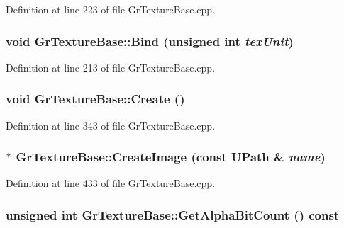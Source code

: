 \begin{CompactItemize}
Definition at line 223 of file GrTextureBase.cpp.\hypertarget{class_gr_texture_base_4458c1c8d784beb36b228813f3edc6f0}{
\subsubsection[{Bind}]{\setlength{\rightskip}{0pt plus 5cm}void GrTextureBase::Bind (unsigned int {\em texUnit})}}
\label{class_gr_texture_base_4458c1c8d784beb36b228813f3edc6f0}




Definition at line 213 of file GrTextureBase.cpp.\hypertarget{class_gr_texture_base_c350ea2f901475fc6cd8bfca56bc5b19}{
\subsubsection[{Create}]{\setlength{\rightskip}{0pt plus 5cm}void GrTextureBase::Create ()}}
\label{class_gr_texture_base_c350ea2f901475fc6cd8bfca56bc5b19}




Definition at line 343 of file GrTextureBase.cpp.\hypertarget{class_gr_texture_base_dcc745602c8ec90a262a1bd9a81556ce}{
\subsubsection[{CreateImage}]{ $\ast$ GrTextureBase::CreateImage (const {\bf UPath} \& {\em name})}}
\label{class_gr_texture_base_dcc745602c8ec90a262a1bd9a81556ce}




Definition at line 433 of file GrTextureBase.cpp.\hypertarget{class_gr_texture_base_4bac8a806715c03befeec5f83ceeb41f}{
\subsubsection[{GetAlphaBitCount}]{\setlength{\rightskip}{0pt plus 5cm}unsigned int GrTextureBase::GetAlphaBitCount () const}}
\label{class_gr_texture_base_4bac8a806715c03befeec5f83ceeb41f}





\end{CompactItemize}

